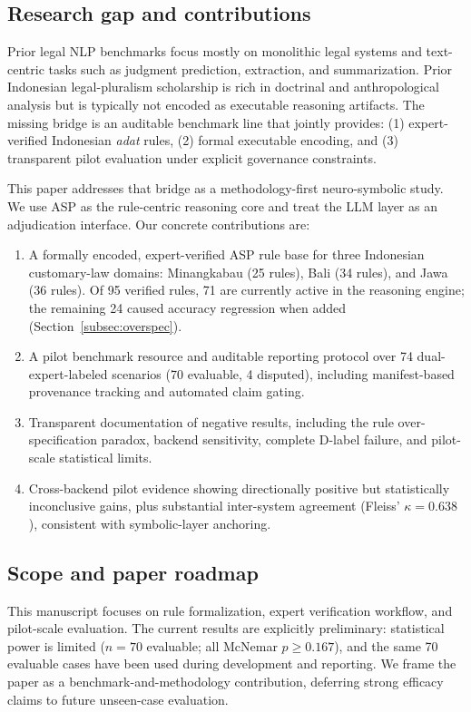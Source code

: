 \documentclass[pdflatex,sn-basic,Numbered]{sn-jnl}
\begin{document}
\subsection{Research gap and contributions}\label{subsec:gap}

Prior legal NLP benchmarks focus mostly on monolithic legal systems and text-centric tasks such as judgment prediction, extraction, and summarization.
Prior Indonesian legal-pluralism scholarship is rich in doctrinal and anthropological analysis but is typically not encoded as executable reasoning artifacts.
The missing bridge is an auditable benchmark line that jointly provides: (1) expert-verified Indonesian \textit{adat} rules, (2) formal executable encoding, and (3) transparent pilot evaluation under explicit governance constraints.

This paper addresses that bridge as a methodology-first neuro-symbolic study.
We use ASP as the rule-centric reasoning core and treat the LLM layer as an adjudication interface.
Our concrete contributions are:
\begin{enumerate}
  \item A formally encoded, expert-verified ASP rule base for three Indonesian customary-law domains: Minangkabau (25 rules), Bali (34 rules), and Jawa (36 rules). Of 95 verified rules, 71 are currently active in the reasoning engine; the remaining 24 caused accuracy regression when added (Section~\ref{subsec:overspec}).
  \item A pilot benchmark resource and auditable reporting protocol over 74 dual-expert-labeled scenarios (70 evaluable, 4 disputed), including manifest-based provenance tracking and automated claim gating.
  \item Transparent documentation of negative results, including the rule over-specification paradox, backend sensitivity, complete D-label failure, and pilot-scale statistical limits.
  \item Cross-backend pilot evidence showing directionally positive but statistically inconclusive gains, plus substantial inter-system agreement (Fleiss' $\kappa = 0.638$), consistent with symbolic-layer anchoring.
\end{enumerate}

\subsection{Scope and paper roadmap}\label{subsec:scope}

This manuscript focuses on rule formalization, expert verification workflow, and pilot-scale evaluation.
The current results are explicitly preliminary: statistical power is limited ($n=70$ evaluable; all McNemar $p \geq 0.167$), and the same 70 evaluable cases have been used during development and reporting.
We frame the paper as a benchmark-and-methodology contribution, deferring strong efficacy claims to future unseen-case evaluation.
\end{document}

